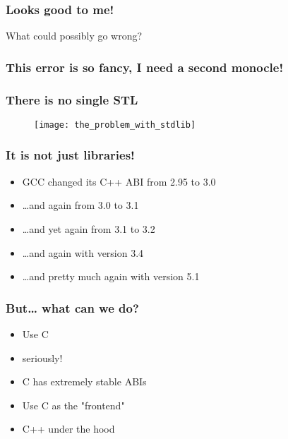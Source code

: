 \begin{frame}[c]
  \frametitle{Looks good to me!}
  \begin{centering}
    \Large{What could possibly go wrong?}
  \end{centering}
\end{frame}

\begin{frame}[c]
  \frametitle{This error is so fancy, I need a second monocle!}
\end{frame}

\begin{frame}[c]
  \frametitle{There is no single STL}
    \begin{figure}
      \centering
      \texttt{[image: the\_problem\_with\_stdlib]}
    \end{figure}
\end{frame}

\begin{frame}[c]
  \frametitle{It is not just libraries!}\pause{}
  \begin{itemize}
    \item{GCC changed its C++ ABI from 2.95 to 3.0}\pause{}
    \item{\ldots{}and again from 3.0 to 3.1}\pause{}
    \item{\ldots{}and yet again from 3.1 to 3.2}\pause{}
    \item{\ldots{}and again with version 3.4}\pause{}
    \item{\ldots{}and pretty much again with version 5.1}
  \end{itemize}
\end{frame}

\begin{frame}[c]
  \frametitle{But\ldots{} what can we do?}\pause
  \begin{itemize}
    \item{Use C}\pause{}
    \item{seriously!}\pause{}
    \item{C has extremely stable ABIs}\pause{}
    \item{Use C as the "frontend"}\pause{}
    \item{C++ under the hood}
  \end{itemize}
\end{frame}

